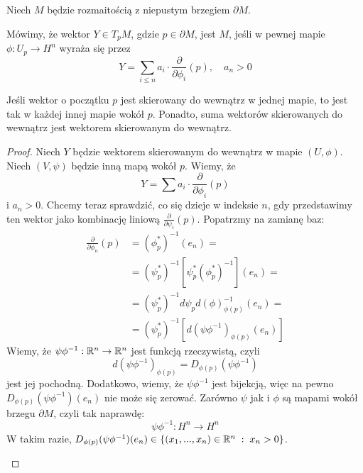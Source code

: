 Niech $M$ będzie rozmaitością z niepustym brzegiem $\partial M$. 

\begin{definition}
  Mówimy, że wektor $Y\in T_pM$, gdzie $p\in\partial M$, jest  $M$, jeśli w pewnej mapie $\phi:U_p\to H^n$ wyraża się przez
  $$Y=\sum_{i\leq n}a_i\cdot\frac{\partial}{\partial\phi_i}(p),\quad a_n>0$$
\end{definition}

\begin{fact}
  Jeśli wektor o początku $p$ jest skierowany do wewnątrz w jednej mapie, to jest tak w każdej innej mapie wokół $p$. Ponadto, suma wektorów skierowanych do wewnątrz jest wektorem skierowanym do wewnątrz.
\end{fact}

\begin{proof}
  Niech $Y$ będzie wektorem skierowanym do wewnątrz w mapie $(U,\phi)$. Niech $(V, \psi)$ będzie inną mapą wokół $p$. Wiemy, że
  $$Y=\sum a_i\cdot\frac{\partial}{\partial\phi_i}(p)$$
  i $a_n>0$. Chcemy teraz sprawdzić, co się dzieje w indeksie $n$, gdy przedstawimy ten wektor jako kombinację liniową $\frac{\partial}{\partial\psi_i}(p)$. Popatrzmy na zamianę baz:
  \begin{align*}
    \frac{\partial}{\partial\phi_n}(p)&=(\phi^*_p)^{-1}(e_n)=\\
        &=(\psi_p^*)^{-1}[\psi_p^*(\phi_p^*)^{-1}](e_n)=\\
        &=(\psi_p^*)^{-1}d\psi_p d(\phi)^{-1}_{\phi(p)}(e_n)=\\
        &=(\psi_p^*)^{-1}[d(\psi\phi^{-1})_{\phi(p)}(e_n)]
  \end{align*}
  Wiemy, że $\psi\phi^{-1}:\mathbb{R}^n\to\mathbb{R}^n$ jest funkcją rzeczywistą, czyli 
  $$d(\psi\phi^{-1})_{\phi(p)}=D_{\phi(p)}(\psi\phi^{-1})$$
  jest jej pochodną. Dodatkowo, wiemy, że $\psi\phi^{-1}$ jest bijekcją, więc na pewno $D_{\phi(p)}(\psi\phi^{-1})(e_n)$ nie może się zerować. Zarówno $\psi$ jak i $\phi$ są mapami wokół brzegu $\partial M$, czyli tak naprawdę:
  $$\psi\phi^{-1}:H^n\to H^n$$
  W takim razie, $D_{\phi(p)}(\psi\phi^{-1})(e_n)\in \{(x_1,...,x_n)\in\mathbb{R}^n\;:\;x_n>0\}$.%

  \begin{center}
\end{center}
\end{proof}
